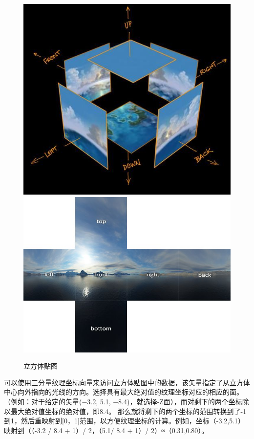 \documentclass[UTF8,a4paper,12pt]{ctexbook}
\begin{document}
			\begin{figure}[H]
				\centering
				\includegraphics[scale=0.57]{cubeMap}
				\includegraphics[scale=0.57]{cubeMap1}
				\caption{立方体贴图}
			\end{figure}
		
		可以使用三分量纹理坐标向量来访问立方体贴图中的数据，该矢量指定了从立方体中心向外指向的光线的方向。选择具有最大绝对值的纹理坐标对应的相应的面。（例如：对于给定的矢量(−3.2, 5.1, −8.4)，就选择-Z面），而对剩下的两个坐标除以最大绝对值坐标的绝对值，即8.4。 那么就将剩下的两个坐标的范围转换到了-1到1，然后重映射到[0，1]范围，以方便纹理坐标的计算。例如，坐标（-3.2,5.1）映射到（（-3.2 / 8.4 + 1）/ 2，（5.1/ 8.4 + 1）/ 2）≈（0.31,0.80）。
		
\end{document}
